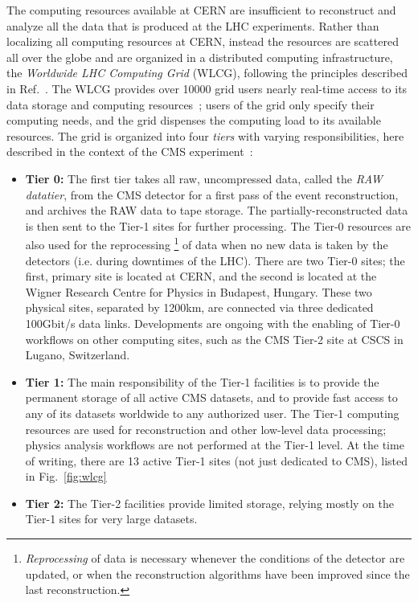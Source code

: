 The computing resources available at CERN are insufficient to reconstruct and analyze all the data that is produced at the LHC experiments.
% 
Rather than localizing all computing resources at CERN, instead the resources are scattered all over the globe and are organized in a distributed computing infrastructure, the \textit{Worldwide LHC Computing Grid} (WLCG), following the principles described in Ref.~\cite{thegrid}.
% 
The WLCG provides over 10000 grid users nearly real-time access to its data storage and computing resources~\cite{wlcgwebsite}; users of the grid only specify their computing needs, and the grid dispenses the computing load to its available resources.
% 
The grid is organized into four \textit{tiers} with varying responsibilities, here described in the context of the CMS experiment~\cite{Bayatyan:838359,CMS:2005aa}:
% 
\begin{itemize}
\item \textbf{Tier 0:} The first tier takes all raw, uncompressed data, called the \emph{RAW datatier}, from the CMS detector for a first pass of the event reconstruction, and archives the RAW data to tape storage.
% 
The partially-reconstructed data is then sent to the Tier-1 sites for further processing.
% 
The Tier-0 resources are also used for the reprocessing%
% 
\footnote{%
\textit{Reprocessing} of data is necessary whenever the conditions of the detector are updated, or when the reconstruction algorithms have been improved since the last reconstruction.
}
% 
of data when no new data is taken by the detectors (i.e. during downtimes of the LHC).
% 
There are two Tier-0 sites; the first, primary site is located at CERN, and the second is located at the Wigner Research Centre for Physics in Budapest, Hungary.
% 
These two physical sites, separated by 1200\unit{km}, are connected via three dedicated 100\unit{Gbit/s} data links.
% 
Developments are ongoing with the enabling of Tier-0 workflows on other computing sites, such as the CMS Tier-2 site at CSCS in Lugano, Switzerland.
% 
\item \textbf{Tier 1:} The main responsibility of the Tier-1 facilities is to provide the permanent storage of all active CMS datasets, and to provide fast access to any of its datasets worldwide to any authorized user.
% 
The Tier-1 computing resources are used for reconstruction and other low-level data processing; physics analysis workflows are not performed at the Tier-1 level.
% 
At the time of writing, there are 13 active Tier-1 sites (not just dedicated to CMS), listed in Fig.~\ref{fig:wlcg}
% 
\item \textbf{Tier 2:} The Tier-2 facilities provide limited storage, relying mostly on the Tier-1 sites for very large datasets.

\end{itemize}
